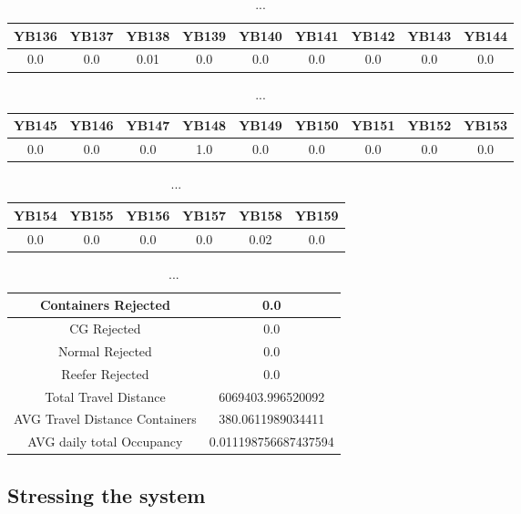 \documentclass[]{article}
\begin{document}
\begin{table}[h]
      \centering
      \begin{tabular}{|c|c|c|c|c|c|c|c|c|}
            \hline
            YB136 & YB137 & YB138 & YB139 & YB140 & YB141 & YB142 & YB143 & YB144 \\
            \hline
            0.0   & 0.0   & 0.01  & 0.0   & 0.0   & 0.0   & 0.0   & 0.0   & 0.0   \\
            \hline
      \end{tabular}
      \caption{...}
\end{table}
\begin{table}[h]
      \centering
      \begin{tabular}{|c|c|c|c|c|c|c|c|c|}
            \hline
            YB145 & YB146 & YB147 & YB148 & YB149 & YB150 & YB151 & YB152 & YB153 \\
            \hline
            0.0   & 0.0   & 0.0   & 1.0   & 0.0   & 0.0   & 0.0   & 0.0   & 0.0   \\
            \hline
      \end{tabular}
      \caption{...}
\end{table}
\begin{table}[h]
      \centering
      \begin{tabular}{|c|c|c|c|c|c|}
            \hline
            YB154 & YB155 & YB156 & YB157 & YB158 & YB159 \\
            \hline
            0.0   & 0.0   & 0.0   & 0.0   & 0.02  & 0.0   \\
            \hline
      \end{tabular}
      \caption{...}
\end{table}
\begin{table}[h]
      \centering
      \begin{tabular}{|c|c|}
            \hline
            Containers Rejected            & 0.0                  \\ \hline
            CG Rejected                    & 0.0                  \\ \hline
            Normal Rejected                & 0.0                  \\ \hline
            Reefer Rejected                & 0.0                  \\ \hline
            Total Travel Distance          & 6069403.996520092    \\ \hline
            AVG Travel Distance Containers & 380.0611989034411    \\ \hline
            AVG daily total Occupancy      & 0.011198756687437594 \\ \hline
      \end{tabular}
      \caption{...}
\end{table}
\subsection{Stressing the system}
\end{document}
